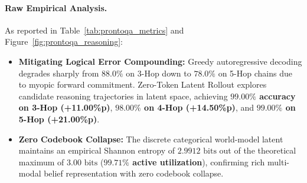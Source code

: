 \begin{table}[t]
\centering
\small
\caption{\textbf{PrOntoQA Multi-Hop Deduction Accuracy and Codebook Metrics.}}
\label{tab:prontoqa_metrics}
\end{table}

\paragraph{Raw Empirical Analysis.}
As reported in Table~\ref{tab:prontoqa_metrics} and Figure~\ref{fig:prontoqa_reasoning}:
\begin{itemize}[leftmargin=*]
    \item \textbf{Mitigating Logical Error Compounding:} Greedy autoregressive decoding degrades sharply from $88.0\%$ on 3-Hop down to $78.0\%$ on 5-Hop chains due to myopic forward commitment. Zero-Token Latent Rollout explores candidate reasoning trajectories in latent space, achieving \textbf{$99.00\%$ accuracy on 3-Hop (+11.00\%p)}, \textbf{$98.00\%$ on 4-Hop (+14.50\%p)}, and \textbf{$99.00\%$ on 5-Hop (+21.00\%p)}.
    \item \textbf{Zero Codebook Collapse:} The discrete categorical world-model latent maintains an empirical Shannon entropy of \textbf{$2.9912\text{ bits}$} out of the theoretical maximum of $3.00\text{ bits}$ (\textbf{$99.71\%$ active utilization}), confirming rich multi-modal belief representation with zero codebook collapse.
\end{itemize}

